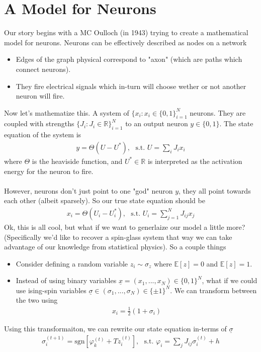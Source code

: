 \section{A Model for Neurons}
Our story begins with a MC Oulloch (in 1943) trying to create a mathematical model for neurons. Neurons can be effectively described as nodes on a network
\begin{itemize}
	\item Edges of the graph physical correspond to "axon" (which are paths which connect neurons).
	\item They fire electrical signals which in-turn will choose wether or not another neuron will fire.
\end{itemize}
Now let's mathematize this. A system of $\{x_i: x_i \in \{0,1\}_{i=1}^N$ neurons. They are coupled with strengths $\{J_i : J_i \in \mathbb R\}_{i=1}^N$ to an output neuron $y \in \{0,1\}$. The state equation of the system is
\begin{align}
	y = \Theta(U - U^*), ~~~ \text{s.t. }U = \sum_i J_i x_i
\end{align}
where $\Theta$ is the heaviside function, and $U^* \in \mathbb R$ is interpreted as the activation energy for the neuron to fire.\\
\\
However, neurons don't just point to one "god" neuron $y$, they all point towards each other (albeit sparsely). So our true state equation should be
\begin{align}
	x_i = \Theta (U_i - U_i^*),  ~~~ \text{s.t. }U_i =\sum_{j=1}^N J_{ij} x_j
\end{align}
Ok, this is all cool, but what if we want to generlaize our model a little more? (Specifically we'd like to recover a spin-glass system that way we can take advantage of our knowledge from statistical physics). So a couple things
\begin{itemize}
	\item Consider defining a random variable $z_i \sim \sigma_z$ where $\mathbb E[z] =0$ and $\mathbb E[z] =1$.
	\item Instead of using binary variables $\underline x = (x_1, ..., x_N) \in \{0,1\}^N$, what if we could use ising-spin variables $\underline \sigma \in (\sigma_1, ..., \sigma_N) \in \{\pm 1\}^N$. We can transform between the two using	\begin{align}
		x_i = \frac{1}{2} (1 + \sigma_i)
	\end{align}
\end{itemize}
Using this transformaiton, we can rewrite our state equation in-terms of $\underline \sigma$
\begin{align}
	\sigma_i^{(t+1)} = \text{sgn}[\varphi_k^{(t)} + T z_i^{(t)}], ~~~ \text{s.t. } \varphi_i= \sum_j J_{ij}\sigma_i^{(t)} + h
\end{align}


